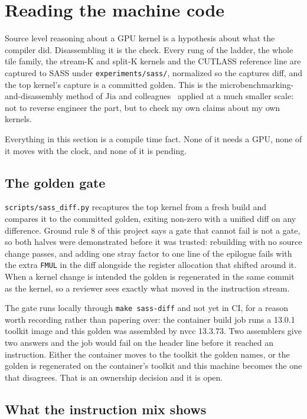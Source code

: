\section{Reading the machine code}
\label{sec:sass}

Source level reasoning about a GPU kernel is a hypothesis about what the compiler
did. Disassembling it is the check. Every rung of the ladder, the whole tile
family, the stream-K and split-K kernels and the CUTLASS reference line are
captured to SASS under \texttt{experiments/sass/}, normalized so the captures
diff, and the top kernel's capture is a committed golden. This is the
microbenchmarking-and-disassembly method of Jia and colleagues~\cite{jia2018}
applied at a much smaller scale: not to reverse engineer the part, but to check my
own claims about my own kernels.

Everything in this section is a compile time fact. None of it needs a GPU, none of
it moves with the clock, and none of it is pending.

\subsection{The golden gate}

\texttt{scripts/sass\_diff.py} recaptures the top kernel from a fresh build and
compares it to the committed golden, exiting non-zero with a unified diff on any
difference. Ground rule 8 of this project says a gate that cannot fail is not a
gate, so both halves were demonstrated before it was trusted: rebuilding with no
source change passes, and adding one stray factor to one line of the epilogue
fails with the extra \texttt{FMUL} in the diff alongside the register allocation
that shifted around it. When a kernel change is intended the golden is regenerated
in the same commit as the kernel, so a reviewer sees exactly what moved in the
instruction stream.

The gate runs locally through \texttt{make sass-diff} and not yet in CI, for a
reason worth recording rather than papering over: the container build job runs a
13.0.1 toolkit image and this golden was assembled by nvcc 13.3.73. Two assemblers
give two answers and the job would fail on the header line before it reached an
instruction. Either the container moves to the toolkit the golden names, or the
golden is regenerated on the container's toolkit and this machine becomes the one
that disagrees. That is an ownership decision and it is open.

\subsection{What the instruction mix shows}


